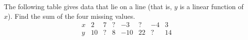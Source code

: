 The following table gives data that lie on a line (that is, $y$ is a linear function of $x$). Find the sum of the four missing values.
\[
\begin{array}{c|ccccccc}
x & 2 & 7 & ? & -3 & ? & -4 & 3\\ \hline
y & 10 & ? & 8 & -10 & 22 & ? & 14
\end{array}
\]
